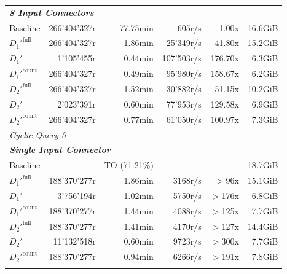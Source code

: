 \begin{longtable}{lrrrrr}
    \multicolumn{6}{l}{\textit{\textbf{8 Input Connectors}}} \\
    \nopagebreak
    Baseline              &  266'404'327r         &  77.75min           &  605r/s              & 1.00x             & 16.6GiB   \\
    $D_1'^{\text{full}}$   &  266'404'327r         &  1.86min            &  25'349r/s           & 41.80x            & 15.2GiB   \\
    \quad $D_1'$           &  1'105'455r           &  0.44min            &  107'503r/s          & 176.70x           & 6.3GiB    \\
    $D_1'^{\text{count}}$  &  266'404'327r         &  0.49min            &  95'980r/s           & 158.67x           & 6.2GiB    \\
    $D_2'^{\text{full}}$   &  266'404'327r         &  1.52min            &  30'882r/s           & 51.15x            & 10.2GiB   \\
    \quad $D_2'$           &  2'023'391r           &  0.60min            &  77'953r/s           & 129.58x           & 6.9GiB    \\
    $D_2'^{\text{count}}$  &  266'404'327r         &  0.77min            &  61'050r/s           & 100.97x           & 7.3GiB    \\
    \midrule
        
    \multicolumn{6}{l}{\textit{Cyclic Query 5}} \\
    \midrule
    \multicolumn{6}{l}{\textit{\textbf{Single Input Connector}}} \\
    \nopagebreak
    Baseline              &  --                   &  TO (71.21\%)       &  --                  & --                & 18.7GiB   \\
    $D_1'^{\text{full}}$   &  188'370'277r         &  1.86min            &  3168r/s             & $>$96x            & 15.1GiB   \\
    \quad $D_1'$           &  3'756'194r           &  1.02min            &  5750r/s             & $>$176x           & 6.8GiB   \\
    $D_1'^{\text{count}}$  &  188'370'277r         &  1.44min            &  4088r/s             & $>$125x           & 7.7GiB   \\
    $D_2'^{\text{full}}$   &  188'370'277r         &  1.41min            &  4170r/s             & $>$127x           & 14.4GiB   \\
    \quad $D_2'$           &  11'132'518r          &  0.60min            &  9723r/s             & $>$300x           & 7.7GiB    \\
    $D_2'^{\text{count}}$  &  188'370'277r         &  0.94min            &  6266r/s             & $>$191x           & 7.8GiB    \\
    \addlinespace 
    

\end{longtable}
